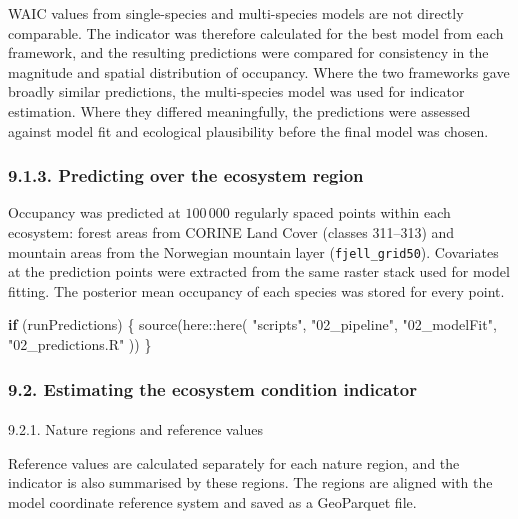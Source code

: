 \documentclass[
  letterpaper,
  DIV=11,
  numbers=noendperiod]{scrartcl}
\makeatletter
\let\oldparagraph\paragraph
\renewcommand{\paragraph}{
    \@ifstar
      \xxxParagraphStar
      \xxxParagraphNoStar
  }
\newcommand{\xxxParagraphStar}[1]{\oldparagraph*{#1}\mbox{}}
\newcommand{\xxxParagraphNoStar}[1]{\oldparagraph{#1}\mbox{}}
\newenvironment{Shaded}{\begin{snugshade}}{\end{snugshade}}
\newcommand{\ControlFlowTok}[1]{\textcolor[rgb]{0.00,0.23,0.31}{\textbf{#1}}}
\newcommand{\FunctionTok}[1]{\textcolor[rgb]{0.28,0.35,0.67}{#1}}
\newcommand{\NormalTok}[1]{\textcolor[rgb]{0.00,0.23,0.31}{#1}}
\newcommand{\SpecialCharTok}[1]{\textcolor[rgb]{0.37,0.37,0.37}{#1}}
\newcommand{\StringTok}[1]{\textcolor[rgb]{0.13,0.47,0.30}{#1}}
\makeatother
\begin{document}
WAIC values from single-species and multi-species models are not
directly comparable. The indicator was therefore calculated for the best
model from each framework, and the resulting predictions were compared
for consistency in the magnitude and spatial distribution of occupancy.
Where the two frameworks gave broadly similar predictions, the
multi-species model was used for indicator estimation. Where they
differed meaningfully, the predictions were assessed against model fit
and ecological plausibility before the final model was chosen.

\subsubsection{9.1.3. Predicting over the ecosystem
region}\label{predicting-over-the-ecosystem-region}

Occupancy was predicted at \(100\,000\) regularly spaced points within
each ecosystem: forest areas from CORINE Land Cover (classes 311--313)
and mountain areas from the Norwegian mountain layer
(\texttt{fjell\_grid50}). Covariates at the prediction points were
extracted from the same raster stack used for model fitting. The
posterior mean occupancy of each species was stored for every point.

\begin{Shaded}
\begin{Highlighting}[]
\ControlFlowTok{if}\NormalTok{ (runPredictions) \{}
  \FunctionTok{source}\NormalTok{(here}\SpecialCharTok{::}\FunctionTok{here}\NormalTok{(}
    \StringTok{"scripts"}\NormalTok{,}
    \StringTok{"02\_pipeline"}\NormalTok{,}
    \StringTok{"02\_modelFit"}\NormalTok{,}
    \StringTok{"02\_predictions.R"}
\NormalTok{  ))}
\NormalTok{\}}
\end{Highlighting}
\end{Shaded}

\subsubsection{9.2. Estimating the ecosystem condition
indicator}\label{estimating-the-ecosystem-condition-indicator}

\paragraph{9.2.1. Nature regions and reference
values}\label{nature-regions-and-reference-values}

Reference values are calculated separately for each nature region, and
the indicator is also summarised by these regions. The regions are
aligned with the model coordinate reference system and saved as a
GeoParquet file.
\end{document}

